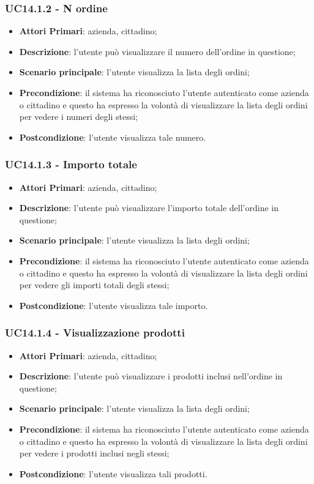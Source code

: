 \subsubsection{UC14.1.2 - N ordine}
\begin{itemize}
	\item \textbf{Attori Primari}: azienda, cittadino;
	\item \textbf{Descrizione}: l'utente può visualizzare il numero dell'ordine in questione;
	\item \textbf{Scenario principale}: l'utente visualizza la lista degli ordini;
	\item \textbf{Precondizione}: il sistema ha riconosciuto l'utente autenticato come azienda o cittadino e questo ha espresso la volontà di visualizzare la lista degli ordini per vedere i numeri degli stessi;
	\item \textbf{Postcondizione}: l'utente visualizza tale numero.
\end{itemize}

\subsubsection{UC14.1.3 - Importo totale}
\begin{itemize}
	\item \textbf{Attori Primari}: azienda, cittadino;
	\item \textbf{Descrizione}: l'utente può visualizzare l'importo totale dell'ordine in questione;
	\item \textbf{Scenario principale}: l'utente visualizza la lista degli ordini;
	\item \textbf{Precondizione}: il sistema ha riconosciuto l'utente autenticato come azienda o cittadino e questo ha espresso la volontà di visualizzare la lista degli ordini per vedere gli importi totali degli stessi;
	\item \textbf{Postcondizione}: l'utente visualizza tale importo.
\end{itemize}

\subsubsection{UC14.1.4 - Visualizzazione prodotti}
\begin{itemize}
	\item \textbf{Attori Primari}: azienda, cittadino;
	\item \textbf{Descrizione}: l'utente può visualizzare i prodotti inclusi nell'ordine in questione;
	\item \textbf{Scenario principale}: l'utente visualizza la lista degli ordini;
	\item \textbf{Precondizione}: il sistema ha riconosciuto l'utente autenticato come azienda o cittadino e questo ha espresso la volontà di visualizzare la lista degli ordini per vedere i prodotti inclusi negli stessi;
	\item \textbf{Postcondizione}: l'utente visualizza tali prodotti.
\end{itemize}

